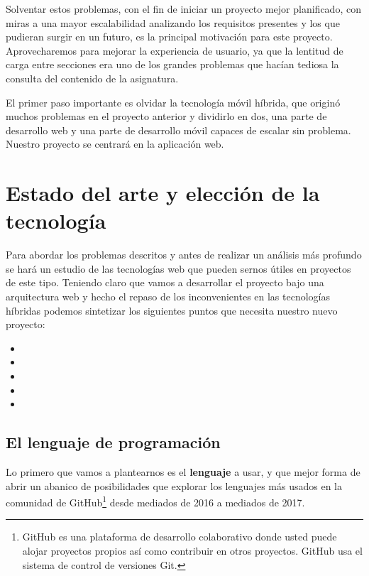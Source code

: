 \bigskip 
Solventar estos problemas, con el fin de iniciar un proyecto mejor planificado, con miras a una mayor escalabilidad analizando los requisitos presentes y los que pudieran surgir en un futuro, es la principal motivación para este proyecto. Aprovecharemos para mejorar la experiencia de usuario, ya que la lentitud de carga entre secciones era uno de los grandes problemas que hacían tediosa la consulta del contenido de la asignatura.

\bigskip
El primer paso importante es olvidar la tecnología móvil híbrida, que originó muchos problemas en el proyecto anterior y dividirlo en dos, una parte de desarrollo web y una parte de desarrollo móvil capaces de escalar sin problema. Nuestro proyecto se centrará en la aplicación web.


\section{Estado del arte y elección de la tecnología}
Para abordar los problemas descritos y antes de realizar un análisis más profundo se hará un estudio de las tecnologías web que pueden sernos útiles en proyectos de este tipo. Teniendo claro que vamos a desarrollar el proyecto bajo una arquitectura web y hecho el repaso de los inconvenientes en las tecnologías híbridas podemos sintetizar los siguientes puntos que necesita nuestro nuevo proyecto:

\begin{itemize}
  \item {}
  \item {}
  \item {}
  \item {}
  \item {}
\end{itemize}

\subsection{El lenguaje de programación}

\bigskip 
Lo primero que vamos a plantearnos es el \textbf{lenguaje} a usar, y que mejor forma de abrir un abanico de posibilidades que explorar los lenguajes más usados en la comunidad de GitHub\footnote{GitHub es una plataforma de desarrollo colaborativo donde usted puede alojar proyectos propios así como contribuir en otros proyectos. GitHub usa el sistema de control de versiones Git.} desde mediados de 2016 a mediados de 2017.

